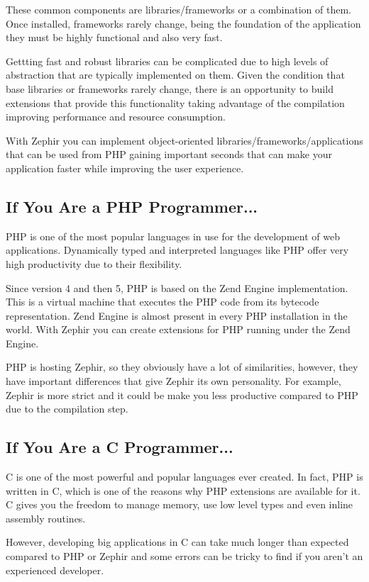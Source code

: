 \documentclass[letterpaper,10pt,english]{sphinxmanual}
\begin{document}
These common components are libraries/frameworks or a combination of them. Once installed, frameworks rarely
change, being the foundation of the application they must be highly functional and also very fast.

Gettting fast and robust libraries can be complicated due to high levels of abstraction that are
typically implemented on them. Given the condition that base libraries or frameworks rarely change,
there is an opportunity to build extensions that provide this functionality taking advantage of the
compilation improving performance and resource consumption.

With Zephir you can implement object-oriented libraries/frameworks/applications that can be used from
PHP gaining important seconds that can make your application faster while improving the user experience.


\subsection{If You Are a PHP Programmer...}
\label{motivation:if-you-are-a-php-programmer}
PHP is one of the most popular languages in use for the development of web applications.
Dynamically typed and interpreted languages like PHP offer very high productivity due to their flexibility.

Since version 4 and then 5, PHP is based on the Zend Engine implementation. This is a virtual machine
that executes the PHP code from its bytecode representation. Zend Engine is almost present in every
PHP installation in the world. With Zephir you can create extensions for PHP running under the
Zend Engine.

PHP is hosting Zephir, so they obviously have a lot of similarities, however, they have
important differences that give Zephir its own personality. For example, Zephir is more strict
and it could be make you less productive compared to PHP due to the compilation step.


\subsection{If You Are a C Programmer...}
\label{motivation:if-you-are-a-c-programmer}
C is one of the most powerful and popular languages ever created. In fact, PHP is written in C,
which is one of the reasons why PHP extensions are available for it. C gives you the freedom to
manage memory, use low level types and even inline assembly routines.

However, developing big applications in C can take much longer than expected compared to PHP or Zephir
and some errors can be tricky to find if you aren't an experienced developer.
\end{document}
